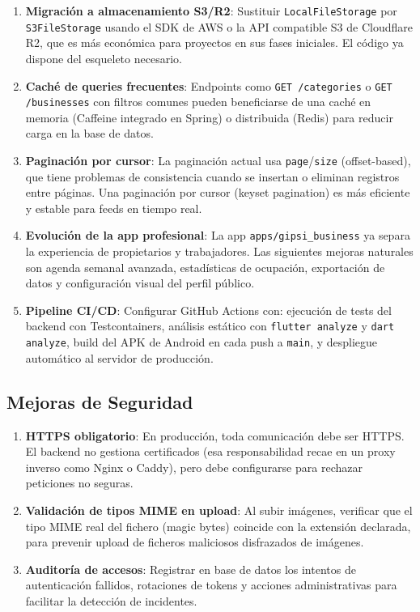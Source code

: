 \documentclass[12pt,a4paper,twoside]{report}
\begin{document}
\begin{enumerate}
  \item \textbf{Migración a almacenamiento S3/R2}: Sustituir \texttt{LocalFileStorage} por \texttt{S3FileStorage} usando el SDK de AWS o la API compatible S3 de Cloudflare R2, que es más económica para proyectos en sus fases iniciales. El código ya dispone del esqueleto necesario.

  \item \textbf{Caché de queries frecuentes}: Endpoints como \texttt{GET /categories} o \texttt{GET /businesses} con filtros comunes pueden beneficiarse de una caché en memoria (Caffeine integrado en Spring) o distribuida (Redis) para reducir carga en la base de datos.

  \item \textbf{Paginación por cursor}: La paginación actual usa \texttt{page}/\texttt{size} (offset-based), que tiene problemas de consistencia cuando se insertan o eliminan registros entre páginas. Una paginación por cursor (keyset pagination) es más eficiente y estable para feeds en tiempo real.

  \item \textbf{Evolución de la app profesional}: La app \texttt{apps/gipsi\_business} ya separa la experiencia de propietarios y trabajadores. Las siguientes mejoras naturales son agenda semanal avanzada, estadísticas de ocupación, exportación de datos y configuración visual del perfil público.

  \item \textbf{Pipeline CI/CD}: Configurar GitHub Actions con: ejecución de tests del backend con Testcontainers, análisis estático con \texttt{flutter analyze} y \texttt{dart analyze}, build del APK de Android en cada push a \texttt{main}, y despliegue automático al servidor de producción.
\end{enumerate}

\subsection{Mejoras de Seguridad}

\begin{enumerate}
  \item \textbf{HTTPS obligatorio}: En producción, toda comunicación debe ser HTTPS. El backend no gestiona certificados (esa responsabilidad recae en un proxy inverso como Nginx o Caddy), pero debe configurarse para rechazar peticiones no seguras.
  \item \textbf{Validación de tipos MIME en upload}: Al subir imágenes, verificar que el tipo MIME real del fichero (magic bytes) coincide con la extensión declarada, para prevenir upload de ficheros maliciosos disfrazados de imágenes.
  \item \textbf{Auditoría de accesos}: Registrar en base de datos los intentos de autenticación fallidos, rotaciones de tokens y acciones administrativas para facilitar la detección de incidentes.
\end{enumerate}
\end{document}
